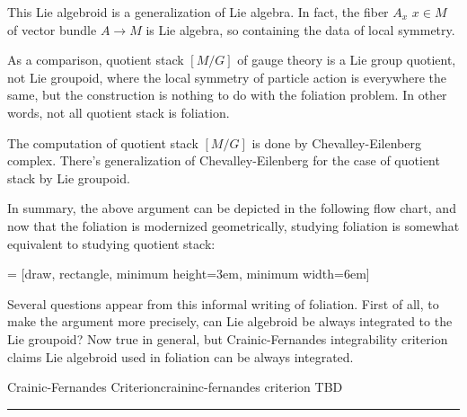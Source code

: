 \documentclass{article}
\begin{document}
This Lie algebroid is a generalization of Lie algebra. In fact, the fiber $A_x$ $x\in M$ of vector bundle $A\to M$ is Lie algebra,
so containing the data of local symmetry.

\begin{remark}{}{}
As a comparison, quotient stack $[M/G]$ of gauge theory is a Lie group quotient, not Lie groupoid,
where the local symmetry of particle action is everywhere the same, but the construction is nothing to do with the foliation problem.
In other words, not all quotient stack is foliation.

The computation of quotient stack $[M/G]$ is done by Chevalley-Eilenberg complex. 
There's generalization of Chevalley-Eilenberg for the case of quotient stack by Lie groupoid.
\end{remark}


In summary, the above argument can be depicted in the following flow chart,
and now that the foliation is modernized geometrically, studying foliation is somewhat equivalent to studying quotient stack:

\vspace{1cm}
 = [draw, rectangle, minimum height=3em, minimum width=6em]
\vspace{1cm}


\noindent
Several questions appear from this informal writing of foliation.
First of all, to make the argument more precisely, can Lie algebroid be always integrated to the Lie groupoid? 
Now true in general, but Crainic-Fernandes integrability criterion claims Lie algebroid used in foliation can be always integrated.


\begin{proposition}{Crainic-Fernandes Criterion}{craininc-fernandes criterion}
TBD
\end{proposition}


\vspace{0.5cm}
\noindent\rule{\textwidth}{0.4pt}
\vspace{0.5cm}
\end{document}
